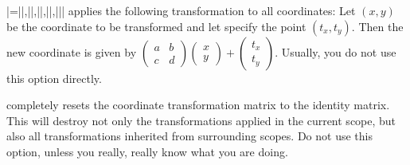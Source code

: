 \begin{itemize}
  |={||,||,||,||,||}|
  applies the following transformation to all coordinates: Let $(x,y)$
  be the coordinate to be transformed and let 
  specify the point $(t_x,t_y)$. Then the new coordinate is given by
  $\left(\begin{smallmatrix} a & b \\ c & d\end{smallmatrix}\right)
  \left(\begin{smallmatrix} x \\ y \end{smallmatrix}\right) +
  \left(\begin{smallmatrix} t_x \\ t_y
  \end{smallmatrix}\right)$. Usually, you do not use this option
  directly. 
\begin{codeexample}[]
\end{codeexample}

  completely resets the coordinate transformation matrix to the
  identity matrix. This will destroy not only the transformations
  applied in the current scope, but also all transformations inherited
  from surrounding scopes. Do not use this option, unless you really,
  really know what you are doing.
\end{itemize}


